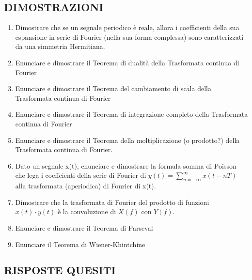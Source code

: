 \documentclass[
  paper=a4,
  ,captions=tableheading
]{scrartcl}
\providecommand{\tightlist}{%
  \setlength{\itemsep}{0pt}\setlength{\parskip}{0pt}}
\begin{document}
\subsection{DIMOSTRAZIONI}\label{dimostrazioni}

\begin{enumerate}
\def\labelenumi{\arabic{enumi}.}
\tightlist
\item
  Dimostrare che se un segnale periodico è reale, allora i coefficienti
  della sua espansione in serie di Fourier (nella sua forma complessa)
  sono caratterizzati da una simmetria Hermitiana.
\item
  Enunciare e dimostrare il Teorema di dualità della Trasformata
  continua di Fourier
\item
  Enunciare e dimostrare il Teorema del cambiamento di scala della
  Trasformata continua di Fourier
\item
  Enunciare e dimostrare il Teorema di integrazione completo della
  Trasformata continua di Fourier
\item
  Enunciare e dimostrare il Teorema della moltiplicazione (o prodotto?)
  della Trasformata continua di Fourier.
\item
  Dato un segnale x(t), enunciare e dimostrare la formula somma di
  Poisson che lega i coeffcienti della serie di Fourier di
  \(\displaystyle y(t) = \sum_{n = -\infty}^{\infty} x(t - nT)\) alla
  trasformata (aperiodica) di Fourier di x(t).
\item
  Dimostrare che la trasformata di Fourier del prodotto di funzioni
  \(x(t) \cdot y(t)\) è la convoluzione di \(X(f)\) con \(Y (f)\).
\item
  Enunciare e dimostrare il Teorema di Parseval
\item
  Enunciare il Teorema di Wiener-Khintchine
\end{enumerate}

\newpage

\subsection{RISPOSTE QUESITI}\label{risposte-quesiti}
\end{document}
